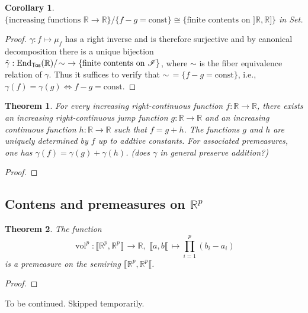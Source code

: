 \documentclass[11pt, a4paper, openany]{book}
\newtheorem{thm}{Theorem}\newtheorem{lem}{Lemma}\newtheorem{crl}{Corollary}
\theoremstyle{definition}
\DeclareMathOperator{\End}{End}
\DeclareMathOperator{\vol}{vol}
\newcommand{\cat}[1]{\textup{\textsf{#1}}}
\begin{document}
    \begin{crl}
        $\{\text{increasing functions }\mathbb{R}\rightarrow\mathbb{R}\}/\{f-g=\text{const}\}\cong \{\text{finite contents on }]\mathbb{R},\mathbb{R}]\}$ in \cat{Set}.
    \end{crl}
    \begin{proof}
        $\gamma:f\mapsto \mu_f$ has a right inverse and is therefore surjective and by canonical decomposition there is a unique bijection $\tilde{\gamma}:\End_\cat{Tos}(\mathbb{R})/\!\sim\,\,\rightarrow \{\text{finite contents on }\mathscr{I}\}$, where $\sim$ is the fiber equivalence relation of $\gamma$. Thus it suffices to verify that $\sim\,=\{f-g=\text{const}\}$, i.e., $\gamma(f)=\gamma(g)\Leftrightarrow f-g=\text{const}$.
    \end{proof}
    \begin{thm}
        For every increasing right-continuous function $f:\mathbb{R}\rightarrow\mathbb{R}$, there exists an increasing right-continuous jump function $g:\mathbb{R}\rightarrow\mathbb{R}$ and an increasing continuous function $h:\mathbb{R}\rightarrow\mathbb{R}$ such that $f=g+h$. The functions $g$ and $h$ are uniquely determined by $f$ up to addtive constants. For associated premeasures, one has $\gamma(f)=\gamma(g)+\gamma(h)$. (does $\gamma$ in general preserve addition?)
    \end{thm}
    \begin{proof}
        
    \end{proof}
\subsection{Contens and premeasures on \texorpdfstring{$\mathbb{R}^p$}{Rp}}
    \begin{thm}
        The function 
        \[\vol^p:\llbracket\mathbb{R}^p,\mathbb{R}^p\llbracket\,\rightarrow \mathbb{R},\,\,\llbracket a,b\llbracket\,\mapsto \prod_{i=1}^p (b_i-a_i)\]
        is a premeasure on the semiring $\llbracket\mathbb{R}^p,\mathbb{R}^p\llbracket$.
    \end{thm}
    \begin{proof}
        
    \end{proof}
     To be continued. Skipped temporarily.
\end{document}
